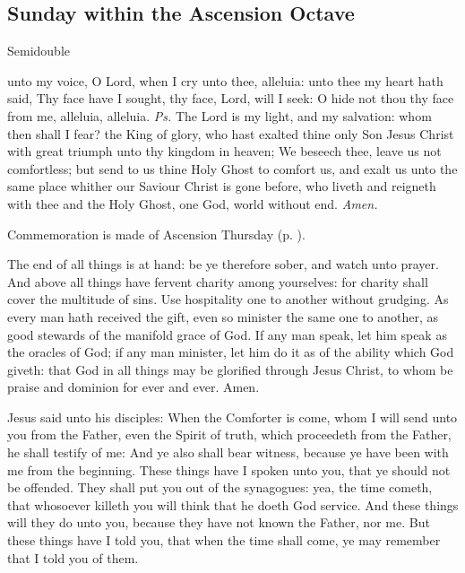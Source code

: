 \clearpage
\subsection{Sunday within the Ascension Octave}
\begin{inhead}
    {Semidouble}
\end{inhead}


\introit
{} unto my voice, O Lord, when I cry unto thee, alleluia: unto thee my heart hath said, Thy face have I sought, thy face, Lord, will I seek: O hide not thou thy face from me, alleluia, alleluia. \textit{Ps.} The Lord is my light, and my salvation: whom then shall I fear?
\collect
{} the King of glory, who hast exalted thine only Son Jesus Christ with great triumph unto thy kingdom in heaven; We beseech thee, leave us not comfortless; but send to us thine Holy Ghost to comfort us, and exalt us unto the same place whither our Saviour Christ is gone before, who liveth and reigneth with thee and the Holy Ghost, one God, world without end. \textit{Amen.}

\begin{rubric}
    Commemoration is made of Ascension Thursday (p. \pageref{AscensionCollect}).
\end{rubric}

 The end of all things is at hand: be ye therefore sober, and watch unto prayer. And above all things have fervent charity among yourselves: for charity shall cover the multitude of sins. Use hospitality one to another without grudging. As every man hath received the gift, even so minister the same one to another, as good stewards of the manifold grace of God. If any man speak, let him speak as the oracles of God; if any man minister, let him do it as of the ability which God giveth: that God in all things may be glorified through Jesus Christ, to whom be praise and dominion for ever and ever. Amen.


 Jesus said unto his disciples: When the Comforter is come, whom I will send unto you from the Father, even the Spirit of truth, which proceedeth from the Father, he shall testify of me: And ye also shall bear witness, because ye have been with me from the beginning. These things have I spoken unto you, that ye should not be offended. They shall put you out of the synagogues: yea, the time cometh, that whosoever killeth you will think that he doeth God service. And these things will they do unto you, because they have not known the Father, nor me. But these things have I told you, that when the time shall come, ye may remember that I told you of them.

